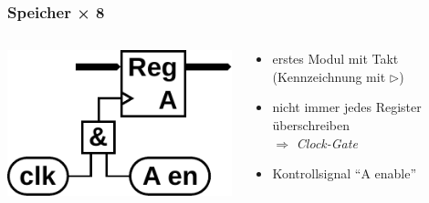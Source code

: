 \documentclass[t,aspectratio=169,usenames,dvipsnames]{beamer}
\begin{document}
\begin{frame}
  \frametitle{Speicher × 8}

  \begin{columns}[T]
    \begin{column}{.45\textwidth}
      \includegraphics[width=\linewidth]{register.pdf}
    \end{column}
    \begin{column}{.45\textwidth}
      \begin{itemize}
      \item erstes Modul mit Takt\\
        (Kennzeichnung mit {\Large$\triangleright$})
      \item nicht immer jedes Register überschreiben\\
        $\Rightarrow$ \emph{Clock-Gate}
      \item Kontrollsignal \enquote{A enable}
      \end{itemize}
    \end{column}
  \end{columns}

\end{frame}
\end{document}
